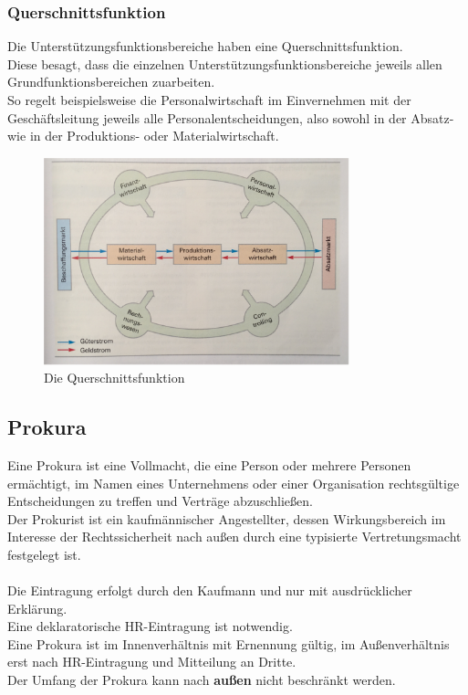 \documentclass[10pt]{article}
\begin{document}
\subsubsection{Querschnittsfunktion}
Die Unterstützungsfunktionsbereiche haben eine Querschnittsfunktion. \\
Diese besagt, dass die einzelnen Unterstützungsfunktionsbereiche jeweils allen Grundfunktionsbereichen zuarbeiten. \\
So regelt beispielsweise die Personalwirtschaft im Einvernehmen mit der Geschäftsleitung jeweils alle Personalentscheidungen, also sowohl in der Absatz- wie in der Produktions- oder Materialwirtschaft.

\begin{figure}[H]
\begin{center}
  \includegraphics[height=6cm]{querschnitt.png}
  \end{center}
  \caption{Die Querschnittsfunktion}
  \label{fig: Die Querschnittsfunktion}
\end{figure}

\subsection{Prokura}
Eine Prokura ist eine Vollmacht, die eine Person oder mehrere Personen ermächtigt, im Namen eines Unternehmens oder einer Organisation rechtsgültige Entscheidungen zu treffen und Verträge abzuschließen. \\
Der Prokurist ist ein kaufmännischer Angestellter, dessen Wirkungsbereich im Interesse der Rechtssicherheit nach außen durch eine typisierte Vertretungsmacht festgelegt ist. \\ \\
Die Eintragung erfolgt durch den Kaufmann und nur mit ausdrücklicher Erklärung. \\
Eine deklaratorische HR-Eintragung ist notwendig. \\
Eine  Prokura ist im  Innenverhältnis mit Ernennung gültig, im Außenverhältnis erst  nach HR-Eintragung und Mitteilung an Dritte. \\
Der Umfang der Prokura kann nach \textbf{außen}  nicht beschränkt werden. \\ \\
\end{document}
